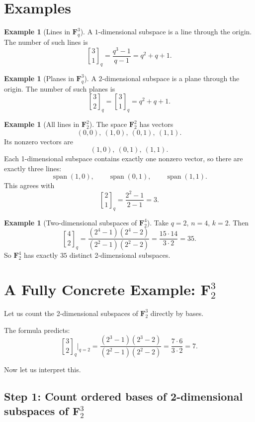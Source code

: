 \documentclass[11pt]{article}
\theoremstyle{definition}
\newtheorem{example}[theorem]{Example}
\theoremstyle{remark}
\newcommand{\F}{\mathbf{F}}
\newcommand{\Span}{\operatorname{span}}
\newcommand{\qbinom}[2]{\genfrac{[}{]}{0pt}{}{#1}{#2}_q}
\begin{document}
	\section{Examples}
	
	\begin{example}[Lines in \(\F_q^3\)]
		A \(1\)-dimensional subspace is a line through the origin. The number of such lines is
		\[
		\qbinom{3}{1}
		=
		\frac{q^3-1}{q-1}
		=
		q^2+q+1.
		\]
	\end{example}
	
	\begin{example}[Planes in \(\F_q^3\)]
		A \(2\)-dimensional subspace is a plane through the origin. The number of such planes is
		\[
		\qbinom{3}{2}
		=
		\qbinom{3}{1}
		=
		q^2+q+1.
		\]
	\end{example}
	
	\begin{example}[All lines in \(\F_2^2\)]
		The space \(\F_2^2\) has vectors
		\[
		(0,0),\ (1,0),\ (0,1),\ (1,1).
		\]
		Its nonzero vectors are
		\[
		(1,0),\ (0,1),\ (1,1).
		\]
		Each 1-dimensional subspace contains exactly one nonzero vector, so there are exactly three lines:
		\[
		\Span(1,0),\qquad
		\Span(0,1),\qquad
		\Span(1,1).
		\]
		This agrees with
		\[
		\qbinom{2}{1}
		=
		\frac{2^2-1}{2-1}
		=
		3.
		\]
	\end{example}
	
	\begin{example}[Two-dimensional subspaces of \(\F_2^4\)]
		Take \(q=2\), \(n=4\), \(k=2\). Then
		\[
		\qbinom{4}{2}
		=
		\frac{(2^4-1)(2^4-2)}{(2^2-1)(2^2-2)}
		=
		\frac{15\cdot 14}{3\cdot 2}
		=
		35.
		\]
		So \(\F_2^4\) has exactly \(35\) distinct 2-dimensional subspaces.
	\end{example}
	
	\section{A Fully Concrete Example: \(\F_2^3\)}
	
	Let us count the 2-dimensional subspaces of \(\F_2^3\) directly by bases.
	
	The formula predicts:
	\[
	\qbinom{3}{2}\Big|_{q=2}
	=
	\frac{(2^3-1)(2^3-2)}{(2^2-1)(2^2-2)}
	=
	\frac{7\cdot 6}{3\cdot 2}
	=
	7.
	\]
	
	Now let us interpret this.
	
	\subsection*{Step 1: Count ordered bases of 2-dimensional subspaces of \(\F_2^3\)}
	
\end{document}
